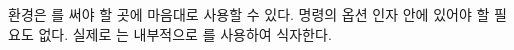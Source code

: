 %
 환경은 를 써야 할 곳에 마음대로 사용할 수 있다.
\cmd{\twocolumn} 명령의 옵션 인자 안에 있어야 할 필요도 없다. 실제로
는 내부적으로 를 사용하여 식자한다.

%
%
%
%
